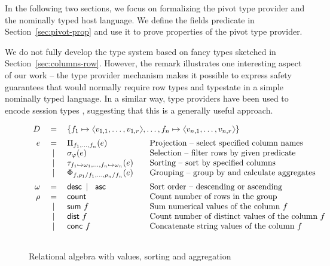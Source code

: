 \documentclass[a4paper,UKenglish]{lipics-v2016}
\theoremstyle{plain}
\theoremstyle{definition}
\newcommand{\vect}[1]{\langl #1 \rangl}
\newcommand{\langl}{\begin{picture}(4.5,7)
\put(1.1,2.5){\rotatebox{60}{\line(1,0){5.5}}}
\put(1.1,2.5){\rotatebox{300}{\line(1,0){5.5}}}
\end{picture}}
\newcommand{\rangl}{\begin{picture}(4.5,7)
\put(.9,2.5){\rotatebox{120}{\line(1,0){5.5}}}
\put(.9,2.5){\rotatebox{240}{\line(1,0){5.5}}}
\end{picture}}
\newcommand{\lsep}{~\,|\,~}
\newcommand{\ident}[1]{\textnormal{\sffamily #1}}
\begin{document}
\noindent
In the following two sections, we focus on formalizing the pivot type provider and the nominally 
typed host language. We define the \ident{fields} predicate in Section~\ref{sec:pivot-prop} and use it 
to prove properties of the pivot type provider.

We do not fully develop the type system based on fancy types sketched in Section~\ref{sec:columns-row}.
However, the remark illustrates one interesting aspect of our work -- the type provider 
mechanism makes it possible to express safety guarantees that would normally require row types and 
typestate in a simple nominally typed language. In a similar way, type providers have been used
to encode session types \cite{sessiontp}, suggesting that this is a generally useful approach.


\begin{figure}

\begin{equation*}
\begin{array}{rclll}
  D & = & \multicolumn{3}{l}{ 
    \{f_1\mapsto \vect{v_{1,1},\ldots,v_{1,r}}, \ldots, f_n\mapsto \vect{v_{n,1},\ldots,v_{n,r}}\} 
  }\\[0.5em]
  e & = & \Pi_{f_1, \ldots, f_n} (e) &&\textnormal{Projection -- select specified column names}\\
   & \lsep & \sigma_\varphi (e) &&\textnormal{Selection -- filter rows by given predicate}\\
   & \lsep & \tau_{f_1\mapsto\omega_1, \ldots, f_n\mapsto\omega_n}(e) &&\textnormal{Sorting -- sort by specified columns}\\
   & \lsep & \Phi_{f, \rho_1/f_1, \ldots, \rho_n/f_n} (e) &&\textnormal{Grouping -- group by and calculate aggregates}
   \\[0.5em]
  \omega & = & \ident{desc}\lsep\ident{asc}  &&\textnormal{Sort order -- descending or ascending}\\
  \rho & = & \ident{count}  &&\textnormal{Count number of rows in the group}\\
   & \lsep & \ident{sum}~f  &&\textnormal{Sum numerical values of the column $f$}\\
   & \lsep & \ident{dist}~f &&\textnormal{Count number of distinct values of the column $f$}\\
   & \lsep & \ident{conc}~f &&\textnormal{Concatenate string values of the column $f$}\\
\\
\end{array} 
\end{equation*}

\vspace{-1.5em}
\caption{Relational algebra with values, sorting and aggregation}
\label{fig:foo-rel}
\end{figure}
\end{document}
